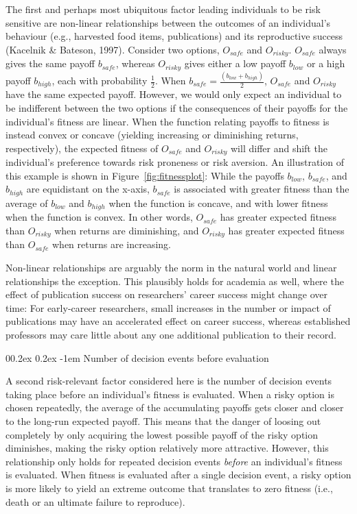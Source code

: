 \documentclass[
  ,man,mask,floatsintext]{apa6}
\makeatletter
\let\oldparagraph\paragraph
\renewcommand{\paragraph}[1]{\oldparagraph{#1}\mbox{}}
\renewcommand{\paragraph}{\@startsection{paragraph}{4}{\parindent}%
  {0\baselineskip \@plus 0.2ex \@minus 0.2ex}%
  {-1em}%
  {\normalfont\normalsize\bfseries\itshape\typesectitle}}
\makeatother
\begin{document}
The first and perhaps most ubiquitous factor leading individuals to be risk sensitive are non-linear relationships between the outcomes of an individual's behaviour (e.g., harvested food items, publications) and its reproductive success (Kacelnik \& Bateson, 1997).
Consider two options, \(O_{safe}\) and \(O_{risky}\).
\(O_{safe}\) always gives the same payoff \(b_{safe}\), whereas \(O_{risky}\) gives either a low payoff \(b_{low}\) or a high payoff \(b_{high}\), each with probability \(\frac{1}{2}\).
When \(b_{safe} = \frac{(b_{low} + b_{high})}{2}\), \(O_{safe}\) and \(O_{risky}\) have the same expected payoff.
However, we would only expect an individual to be indifferent between the two options if the consequences of their payoffs for the individual's fitness are linear.
When the function relating payoffs to fitness is instead convex or concave (yielding increasing or diminishing returns, respectively), the expected fitness of \(O_{safe}\) and \(O_{risky}\) will differ and shift the individual's preference towards risk proneness or risk aversion.
An illustration of this example is shown in Figure~\ref{fig:fitnessplot}:
While the payoffs \(b_{low}\), \(b_{safe}\), and \(b_{high}\) are equidistant on the x-axis, \(b_{safe}\) is associated with greater fitness than the average of \(b_{low}\) and \(b_{high}\) when the function is concave, and with lower fitness when the function is convex.
In other words, \(O_{safe}\) has greater expected fitness than \(O_{risky}\) when returns are diminishing, and \(O_{risky}\) has greater expected fitness than \(O_{safe}\) when returns are increasing.

Non-linear relationships are arguably the norm in the natural world and linear relationships the exception.
This plausibly holds for academia as well, where the effect of publication success on researchers' career success might change over time:
For early-career researchers, small increases in the number or impact of publications may have an accelerated effect on career success, whereas established professors may care little about any one additional publication to their record.

\hypertarget{number-of-decision-events-before-evaluation}{%
\paragraph{Number of decision events before evaluation}\label{number-of-decision-events-before-evaluation}}

A second risk-relevant factor considered here is the number of decision events taking place before an individual's fitness is evaluated.
When a risky option is chosen repeatedly, the average of the accumulating payoffs gets closer and closer to the long-run expected payoff.
This means that the danger of loosing out completely by only acquiring the lowest possible payoff of the risky option diminishes, making the risky option relatively more attractive.
However, this relationship only holds for repeated decision events \emph{before} an individual's fitness is evaluated.
When fitness is evaluated after a single decision event, a risky option is more likely to yield an extreme outcome that translates to zero fitness (i.e., death or an ultimate failure to reproduce).
\end{document}
